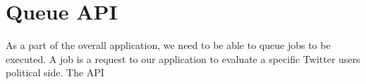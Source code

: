 \chapter{Queue \ac{API}}
As a part of the overall application, we need to be able to queue jobs to be
executed. A job is a request to our application to evaluate a specific Twitter
users political side. The \ac{API} 
